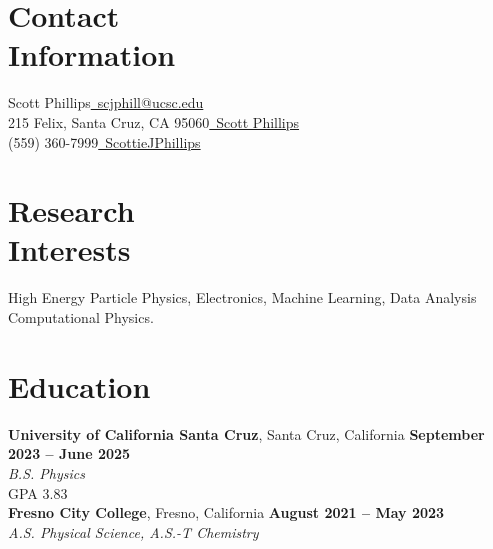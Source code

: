 \documentclass[margin,line]{resume}
\let\origsection\section%
\let\section\subsection%
\let\section\origsection%
\begin{document}
\begin{resume}

\section{\mysidestyle Contact\\Information}

Scott Phillips\hfill \href{mailto:scjphill@ucsc.edu}{~scjphill@ucsc.edu}
\vspace{0mm}\\\vspace{0mm}%
215 Felix, Santa Cruz, CA 95060\hfill  \href{https://www.linkedin.com/in/scott-phillips-438583176/}{~Scott Phillips}
\vspace{0mm}\\\vspace{0mm}%
(559) 360-7999\hfill \href{https://github.com/ScottieJPhillips}{~ScottieJPhillips}
\vspace{0mm}\\\vspace{0mm}%
\vspace{-6.5mm}%

\section{\mysidestyle Research\\Interests}
{\small
High Energy Particle Physics, Electronics, Machine Learning, Data Analysis\\Computational Physics.
}
\section{\mysidestyle Education}

\textbf{University of California Santa Cruz}, Santa Cruz, California \hfill \textbf{September 2023 -- June 2025}\\
\textsl{B.S. Physics}\\{GPA 3.83}\\
%
\textbf{Fresno City College}, Fresno, California \hfill \textbf{August 2021 -- May 2023}\\
\textsl{A.S. Physical Science, A.S.-T Chemistry}
%
%


\end{resume}
\end{document}
